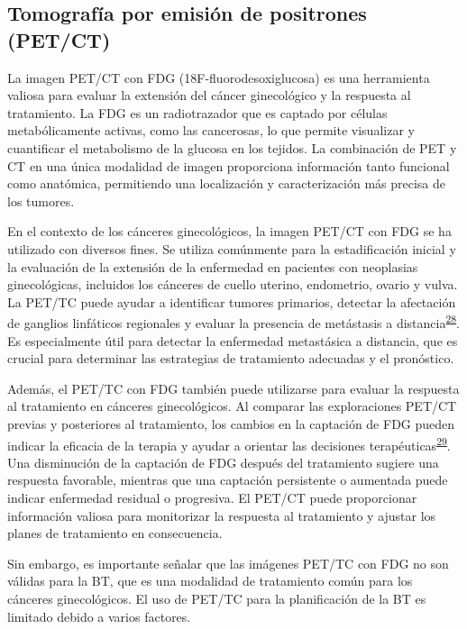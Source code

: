 \documentclass[
  a4paper,
]{scrreprt}
\begin{document}
\hypertarget{sec-imagePET}{%
\subsection{Tomografía por emisión de positrones
(PET/CT)}\label{sec-imagePET}}

La imagen PET/CT con FDG (18F-fluorodesoxiglucosa) es una herramienta
valiosa para evaluar la extensión del cáncer ginecológico y la respuesta
al tratamiento. La FDG es un radiotrazador que es captado por células
metabólicamente activas, como las cancerosas, lo que permite visualizar
y cuantificar el metabolismo de la glucosa en los tejidos. La
combinación de PET y CT en una única modalidad de imagen proporciona
información tanto funcional como anatómica, permitiendo una localización
y caracterización más precisa de los tumores.

En el contexto de los cánceres ginecológicos, la imagen PET/CT con FDG
se ha utilizado con diversos fines. Se utiliza comúnmente para la
estadificación inicial y la evaluación de la extensión de la enfermedad
en pacientes con neoplasias ginecológicas, incluidos los cánceres de
cuello uterino, endometrio, ovario y vulva. La PET/TC puede ayudar a
identificar tumores primarios, detectar la afectación de ganglios
linfáticos regionales y evaluar la presencia de metástasis a
distancia\textsuperscript{\protect\hyperlink{ref-ora2022}{28}}. Es
especialmente útil para detectar la enfermedad metastásica a distancia,
que es crucial para determinar las estrategias de tratamiento adecuadas
y el pronóstico.

Además, el PET/TC con FDG también puede utilizarse para evaluar la
respuesta al tratamiento en cánceres ginecológicos. Al comparar las
exploraciones PET/CT previas y posteriores al tratamiento, los cambios
en la captación de FDG pueden indicar la eficacia de la terapia y ayudar
a orientar las decisiones
terapéuticas\textsuperscript{\protect\hyperlink{ref-fracasso2022}{29}}.
Una disminución de la captación de FDG después del tratamiento sugiere
una respuesta favorable, mientras que una captación persistente o
aumentada puede indicar enfermedad residual o progresiva. El PET/CT
puede proporcionar información valiosa para monitorizar la respuesta al
tratamiento y ajustar los planes de tratamiento en consecuencia.

Sin embargo, es importante señalar que las imágenes PET/TC con FDG no
son válidas para la BT, que es una modalidad de tratamiento común para
los cánceres ginecológicos. El uso de PET/TC para la planificación de la
BT es limitado debido a varios factores.
\end{document}
